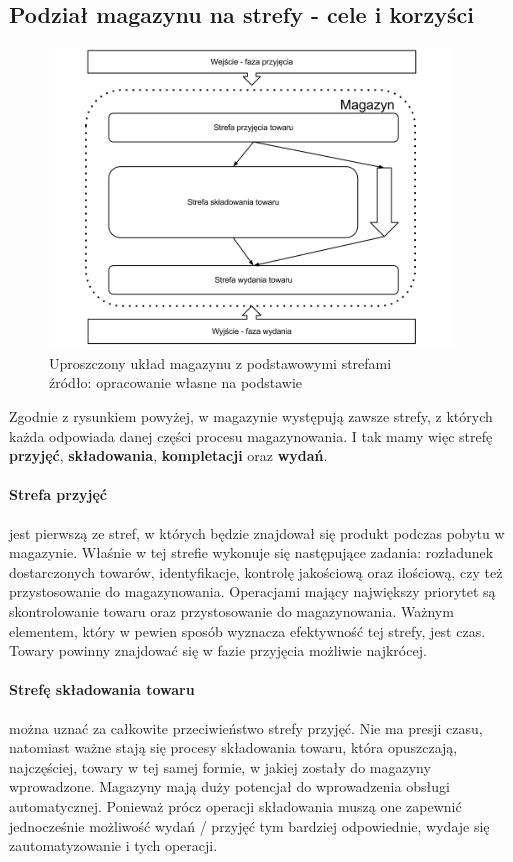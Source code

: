 	\subsection{Podział magazynu na strefy - cele i korzyści}
		\begin{figure}[h]
			\centering
			\includegraphics[width=0.95\textwidth]{images/warehouse_simple_schema}
			\caption[Obszary magazynu - układ uproszczony]{
				Uproszczony układ magazynu z podstawowymi strefami\\
				źródło: opracowanie własne na podstawie \cite{systemyLogistyczne_pfohl}
			}
			\label{c4:warehouse_simple_schema}
		\end{figure}
		Zgodnie z rysunkiem powyżej, w magazynie występują zawsze strefy, z których każda odpowiada danej
		części procesu magazynowania. I tak mamy więc strefę \textbf{przyjęć}, \textbf{składowania}, \textbf{kompletacji} oraz \textbf{wydań}.
		
		\paragraph{Strefa przyjęć} jest pierwszą ze stref, w których będzie znajdował się produkt podczas pobytu w magazynie. 
		Właśnie w tej strefie wykonuje się następujące zadania: rozładunek dostarczonych towarów, identyfikacje, kontrolę jakościową
		oraz ilościową, czy też przystosowanie do magazynowania. Operacjami mający największy priorytet są skontrolowanie
		towaru oraz przystosowanie do magazynowania. Ważnym elementem, który w pewien sposób wyznacza efektywność tej strefy, jest
		czas. Towary powinny znajdować się w fazie przyjęcia możliwie najkrócej.
		\paragraph{Strefę składowania towaru} można uznać za całkowite przeciwieństwo strefy przyjęć. Nie ma presji czasu, 
		natomiast ważne stają się procesy składowania towaru, która opuszczają, najczęściej, towary w tej samej formie,
		w jakiej zostały do magazyny wprowadzone. Magazyny mają duży potencjał do wprowadzenia obsługi automatycznej. 
		Ponieważ prócz operacji składowania muszą one zapewnić jednocześnie możliwość wydań / przyjęć tym bardziej odpowiednie,
		wydaje się zautomatyzowanie i tych operacji. 
